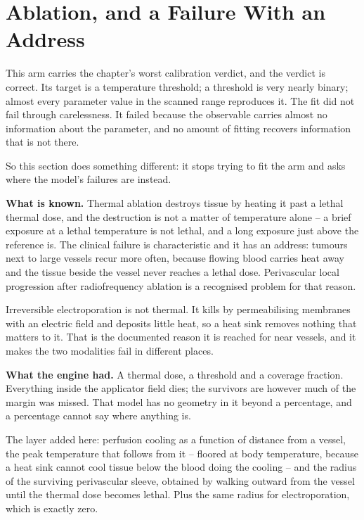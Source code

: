 \documentclass[11pt,twoside,openright]{report}
\begin{document}
\section{Ablation, and a Failure With an Address}

This arm carries the chapter's worst calibration verdict, and the verdict is correct. Its target is a temperature threshold; a threshold is very nearly binary; almost every parameter value in the scanned range reproduces it. The fit did not fail through carelessness. It failed because the observable carries almost no information about the parameter, and no amount of fitting recovers information that is not there.

So this section does something different: it stops trying to fit the arm and asks where the model's failures are instead.

\textbf{What is known.} Thermal ablation destroys tissue by heating it past a lethal thermal dose, and the destruction is not a matter of temperature alone -- a brief exposure at a lethal temperature is not lethal, and a long exposure just above the reference is. The clinical failure is characteristic and it has an address: tumours next to large vessels recur more often, because flowing blood carries heat away and the tissue beside the vessel never reaches a lethal dose. Perivascular local progression after radiofrequency ablation is a recognised problem for that reason.

Irreversible electroporation is not thermal. It kills by permeabilising membranes with an electric field and deposits little heat, so a heat sink removes nothing that matters to it. That is the documented reason it is reached for near vessels, and it makes the two modalities fail in different places.

\textbf{What the engine had.} A thermal dose, a threshold and a coverage fraction. Everything inside the applicator field dies; the survivors are however much of the margin was missed. That model has no geometry in it beyond a percentage, and a percentage cannot say where anything is.

\begin{numbers}
The layer added here: perfusion cooling as a function of distance from a vessel, the peak temperature that follows from it -- floored at body temperature, because a heat sink cannot cool tissue below the blood doing the cooling -- and the radius of the surviving perivascular sleeve, obtained by walking outward from the vessel until the thermal dose becomes lethal. Plus the same radius for electroporation, which is exactly zero.
\end{numbers}
\end{document}
